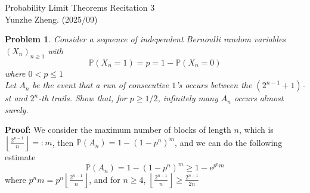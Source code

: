 \documentclass[12pt]{article}
\newtheorem{problem}{Problem}
\begin{document}
\noindent Probability Limit Theorems \hfill Recitation 3\\
Yunzhe Zheng. (2025/09)

\hrulefill

\begin{problem}
    Consider a sequence of independent Bernoulli random variables $(X_n)_{n\geq 1}$ with 
    $$
        \mathbb{P}(X_n=1)=p=1-\mathbb{P}(X_n=0)
    $$
    where $0< p\leq 1$ \\
    \indent Let $A_n$ be the event that a run of consecutive $1$'s occurs between the $(2^{n-1}+1)$-st and $2^n$-th trails. Show that, for $p\geq 1/2$, infinitely many $A_n$ occurs almost surely.
\end{problem}

\textbf{Proof:} We consider the maximum number of blocks of length $n$, which is $\left\lfloor\frac{2^{n-1}}{n}\right\rfloor=: m$, then $\mathbb{P}(A_n)=1-(1-p^n)^m$, and we can do the following estimate
$$
    \mathbb{P}(A_n)=1-(1-p^n)^m\geq 1-e^{p^nm}
$$
where $p^nm=p^n\left\lfloor\frac{2^{n-1}}{n}\right\rfloor$, and for $n\geq 4$, $\left\lfloor\frac{2^{n-1}}{n}\right\rfloor\geq\frac{2^{n-1}}{2n}$
\end{document}
